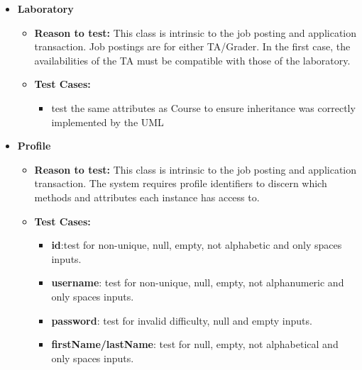 \documentclass[12pt]{report}
\begin{document}
\begin{itemize}
        \item \textbf{Laboratory}
        \begin{itemize}
            \item \textbf{Reason to test:} This class is intrinsic to the job posting and application transaction. Job postings are for either TA/Grader. In the first case, the availabilities of the TA must be compatible with those of the laboratory.
            \item \textbf{Test Cases:} 
            \begin{itemize}
                \item test the same attributes as Course to ensure inheritance was correctly implemented by the UML
            \end{itemize}
        \end{itemize}
        
        \item \textbf{Profile}
        \begin{itemize}
            \item \textbf{Reason to test:} This class is intrinsic to the job posting and application transaction. The system requires profile identifiers to discern which methods and attributes each instance has access to.
            \item \textbf{Test Cases:} 
            \begin{itemize}
                \item \textbf{id}:test for non-unique, null, empty, not alphabetic and only spaces inputs.
                \item \textbf{username}: test for non-unique, null, empty, not alphanumeric and only spaces inputs.
                \item \textbf{password}: test for invalid difficulty, null and empty inputs.
                \item \textbf{firstName/lastName}: test for null, empty, not alphabetical and only spaces inputs.
            \end{itemize}
        \end{itemize} 
        

\end{itemize}
\end{document}
